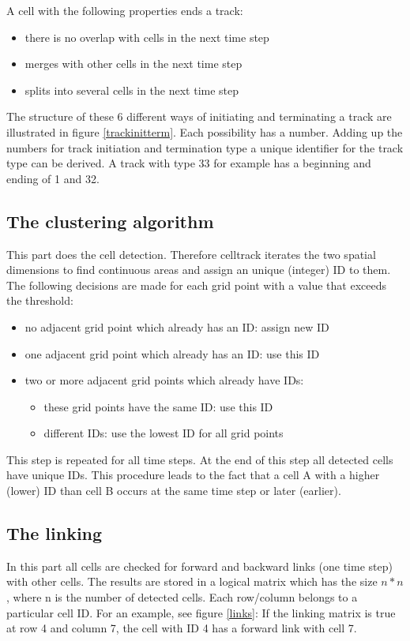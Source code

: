 \documentclass{scrartcl}
\begin{document}
 A cell with the following properties ends a track:
\begin{itemize}
	\item there is no overlap with cells in the next time step
	\item merges with other cells in the next time step
	\item splits into several cells in the next time step
\end{itemize}
The structure of these 6 different ways of initiating and terminating a track are illustrated in figure \ref{trackinitterm}. Each possibility has a number. Adding up the numbers for track initiation and termination type a unique identifier for the track type can be derived. A track with type 33 for example has a beginning and ending of 1 and 32. 

\subsection{The clustering algorithm}
This part does the cell detection. Therefore celltrack iterates the two spatial dimensions to find continuous areas and assign an unique (integer) ID to them. The following decisions are made for each grid point with a value that exceeds the threshold:
\begin{itemize}
	\item no adjacent grid point which already has an ID: assign new ID
	\item one adjacent grid point which already has an ID: use this ID
	\item two or more adjacent grid points which already have  IDs:
	\begin{itemize}
		\item these grid points have the same ID: use this ID
		\item different IDs: use the lowest ID for all grid points
	\end{itemize}
\end{itemize}
This step is repeated for all time steps. At the end of this step all detected cells have unique IDs. This procedure leads to the fact that a cell A with a higher (lower) ID than cell B occurs at the same time step or later (earlier).

\subsection{The linking}
In this part all cells are checked for forward and backward links (one time step) with other cells. The results are stored in a logical matrix which has the size $n * n$, where n is the number of detected cells. Each row/column belongs to a particular cell ID. For an example, see figure \ref{links}: If the linking matrix is true at row 4 and column 7, the cell with ID 4 has a forward link with cell 7.
\end{document}
